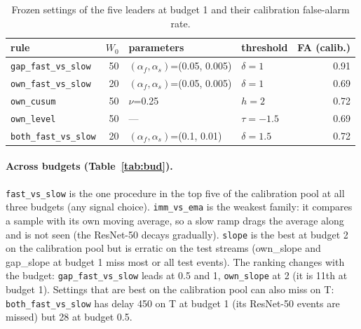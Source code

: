 \documentclass[10pt]{article}
\newcommand{\rl}[1]{\texttt{#1}}
\newcommand{\rn}{ResNet-50}
\begin{document}
\begin{table}[ht]
  \centering\small
  \caption{Frozen settings of the five leaders at budget 1 and their calibration false-alarm rate.}
  \label{tab:sel}
  \begin{tabular}{lrllr}
    \toprule
    rule & $W_0$ & parameters & threshold & FA (calib.) \\
    \midrule
    \rl{gap\_fast\_vs\_slow} & 50 & $(\alpha_f,\alpha_s)$=(0.05, 0.005) & $\delta = 1$ & 0.91 \\
    \rl{own\_fast\_vs\_slow} & 20 & $(\alpha_f,\alpha_s)$=(0.05, 0.005) & $\delta = 1$ & 0.69 \\
    \rl{own\_cusum} & 50 & $\nu$=0.25 & $h = 2$ & 0.72 \\
    \rl{own\_level} & 50 & --- & $\tau = -1.5$ & 0.69 \\
    \rl{both\_fast\_vs\_slow} & 20 & $(\alpha_f,\alpha_s)$=(0.1, 0.01) & $\delta = 1.5$ & 0.72 \\
    \bottomrule
  \end{tabular}
\end{table}

\paragraph{Across budgets (Table~\ref{tab:bud}).} \rl{fast\_vs\_slow} is the one procedure in the top five of the calibration pool at all three budgets (any signal choice). \rl{imm\_vs\_ema} is the weakest family: it compares a sample with its own moving average, so a slow ramp drags the average along and is not seen (the \rn{} decays gradually). \rl{slope} is the best at budget 2 on the calibration pool but is erratic on the test streams (own\_slope and gap\_slope at budget 1 miss most or all test events).
The ranking changes with the budget: \rl{gap\_fast\_vs\_slow} leads at 0.5 and 1, \rl{own\_slope} at 2 (it is 11th at budget 1). Settings that are best on the calibration pool can also miss on T: \rl{both\_fast\_vs\_slow} has delay 450 on T at budget 1 (its \rn{} events are missed) but 28 at budget 0.5.
\end{document}
